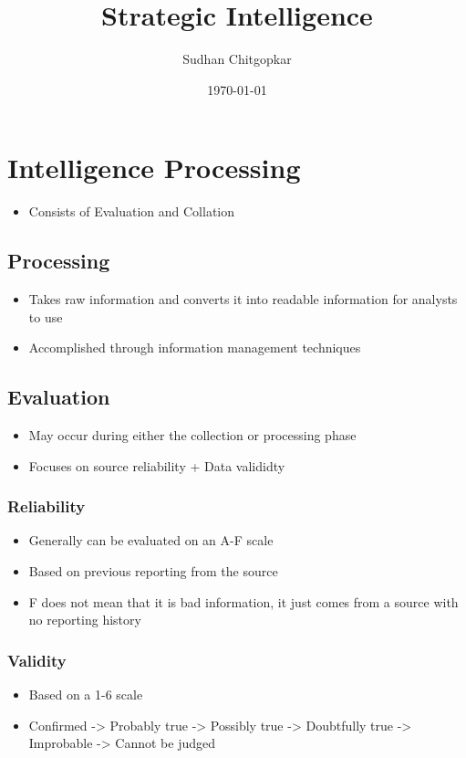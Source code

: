 \documentclass[11pt]{article}
\author{Sudhan Chitgopkar}
\date{\today}
\title{Strategic Intelligence}
\begin{document}
\maketitle
\tableofcontents \clearpage\section{Intelligence Processing}
\label{sec:org01910c2}
\begin{itemize}
\item Consists of Evaluation and Collation
\end{itemize}
\subsection{Processing}
\label{sec:org5835a45}
\begin{itemize}
\item Takes raw information and converts it into readable information for analysts to use
\item Accomplished through information management techniques
\end{itemize}
\subsection{Evaluation}
\label{sec:org7aa65b9}
\begin{itemize}
\item May occur during either the collection or processing phase
\item Focuses on source reliability + Data valididty
\end{itemize}
\subsubsection{Reliability}
\label{sec:orgcea5d07}
\begin{itemize}
\item Generally can be evaluated on an A-F scale
\item Based on previous reporting from the source
\item F does not mean that it is bad information, it just comes from a source with no reporting history
\end{itemize}
\subsubsection{Validity}
\label{sec:orgeaef36b}
\begin{itemize}
\item Based on a 1-6 scale
\item Confirmed -> Probably true -> Possibly true -> Doubtfully true -> Improbable -> Cannot be judged
\end{itemize}
\end{document}
